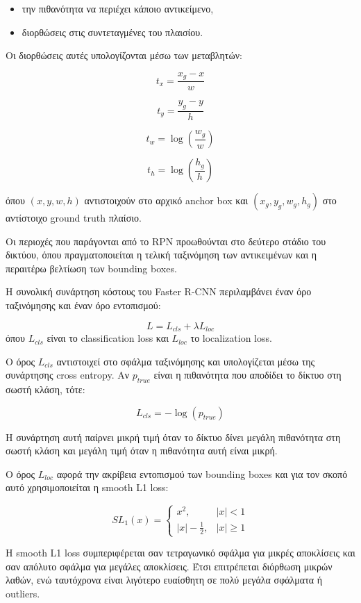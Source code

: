 \documentclass[12pt]{article}
\begin{document}
\begin{itemize}
\item την πιθανότητα να περιέχει κάποιο αντικείμενο,
\item διορθώσεις στις συντεταγμένες του πλαισίου.
\end{itemize}

Οι διορθώσεις αυτές υπολογίζονται μέσω των μεταβλητών:

\[
t_x=
\frac{x_g-x}{w}
\]

\[
t_y=
\frac{y_g-y}{h}
\]

\[
t_w=
\log
\left(
\frac{w_g}{w}
\right)
\]

\[
t_h=
\log
\left(
\frac{h_g}{h}
\right)
\]

όπου $(x,y,w,h)$ αντιστοιχούν στο αρχικό anchor box και $(x_g,y_g,w_g,h_g)$ στο αντίστοιχο ground truth πλαίσιο.

Οι περιοχές που παράγονται από το RPN προωθούνται στο δεύτερο στάδιο του δικτύου, όπου πραγματοποιείται η τελική ταξινόμηση των αντικειμένων και η 
περαιτέρω βελτίωση των bounding boxes.

Η συνολική συνάρτηση κόστους του Faster R-CNN περιλαμβάνει έναν όρο ταξινόμησης και έναν όρο εντοπισμού:

\[
L = L_{cls} + \lambda L_{loc}
\]
όπου $L_{cls}$ είναι το classification loss και $L_{loc}$ το localization loss.

Ο όρος \(L_{cls}\) αντιστοιχεί στο σφάλμα ταξινόμησης και υπολογίζεται μέσω της συνάρτησης cross entropy. Αν \(p_{true}\) είναι η πιθανότητα 
που αποδίδει το δίκτυο στη σωστή κλάση, τότε:

\[
L_{cls} = -\log(p_{true})
\]

Η συνάρτηση αυτή παίρνει μικρή τιμή όταν το δίκτυο δίνει μεγάλη πιθανότητα στη σωστή κλάση και μεγάλη τιμή όταν η πιθανότητα αυτή είναι μικρή.

Ο όρος \(L_{loc}\) αφορά την ακρίβεια εντοπισμού των bounding boxes και για τον σκοπό αυτό χρησιμοποιείται η smooth L1 loss:

\[
SL_1(x)=
\begin{cases}
x^2, & |x| < 1 \\
|x|-\frac{1}{2}, & |x| \geq 1
\end{cases}
\]

Η smooth L1 loss συμπεριφέρεται σαν τετραγωνικό σφάλμα για μικρές αποκλίσεις και σαν απόλυτο σφάλμα για μεγάλες αποκλίσεις. Έτσι επιτρέπεται
διόρθωση μικρών λαθών, ενώ ταυτόχρονα είναι λιγότερο ευαίσθητη σε πολύ μεγάλα σφάλματα ή outliers.
\end{document}
